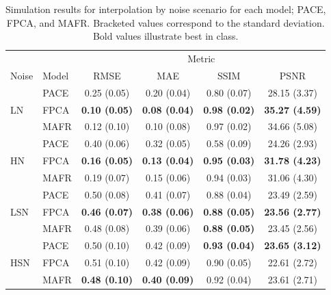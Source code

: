 \begin{table}[htbp!] 
	\caption[Simulation results for interpolation by noise scenario with the three models under consideration.]{Simulation results for interpolation by noise scenario for each model; PACE, FPCA, and MAFR. Bracketed values correspond to the standard deviation. Bold values illustrate best in class.}
	\centering
	\label{tab:ftsm_sim_interp}
	\begin{tabular}{l l c c c c}
		\toprule
		& & \multicolumn{4}{c}{Metric} \\ 
		Noise & Model & RMSE & MAE & SSIM & PSNR \\
		\midrule
		\multirow{3}{*}{LN}& PACE & 0.25 (0.05) & 0.20 (0.04) & 0.80 (0.07) & 28.15 (3.37) \\
		& FPCA  & \textbf{0.10 (0.05)} & \textbf{0.08 (0.04)} & \textbf{0.98 (0.02)} & \textbf{35.27 (4.59)} \\
		& MAFR  & 0.12 (0.10) & 0.10 (0.08) & 0.97 (0.02)  & 34.66 (5.08) \\
		\midrule
		\multirow{3}{*}{HN} & PACE & 0.40 (0.06) & 0.32 (0.05) & 0.58 (0.09) & 24.26 (2.93) \\
		& FPCA  & \textbf{0.16 (0.05)} & \textbf{0.13 (0.04)} & \textbf{0.95 (0.03)} & \textbf{31.78 (4.23)} \\
		& MAFR  & 0.19 (0.07) & 0.15 (0.06) & 0.94 (0.03)  & 31.06 (4.30) \\
		\midrule
		\multirow{3}{*}{LSN} & PACE & 0.50 (0.08) & 0.41 (0.07) & 0.88 (0.04) & 23.49 (2.59) \\
		& FPCA  & \textbf{0.46 (0.07)} & \textbf{0.38 (0.06)} & \textbf{0.88 (0.05)} & \textbf{23.56 (2.77)} \\
		& MAFR  & 0.48 (0.08) & 0.39 (0.06) & \textbf{0.88 (0.05)}  & 23.45 (2.56)\\
		\midrule
		\multirow{3}{*}{HSN} & PACE & 0.50 (0.10) & 0.42 (0.09) & \textbf{0.93 (0.04)} & \textbf{23.65 (3.12)}  \\
		& FPCA  & 0.51 (0.10) & 0.42 (0.09) & 0.90 (0.05) & 22.61 (2.72) \\
		& MAFR  & \textbf{0.48 (0.10)} & \textbf{0.40 (0.09)} & 0.92 (0.04) & 23.61 (2.71) \\
		\bottomrule
	\end{tabular}
\end{table}

